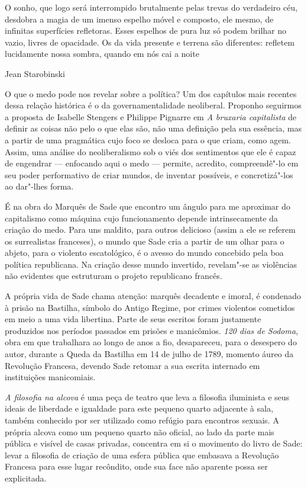 \epigraph{O sonho, que logo será interrompido brutalmente pelas trevas do
verdadeiro céu, desdobra a magia de um imenso espelho móvel e composto,
ele mesmo, de infinitas superfícies refletoras. Esses espelhos de pura
luz só podem brilhar no vazio, livres de opacidade. Os da vida presente
e terrena são diferentes: refletem lucidamente nossa sombra, quando em
nós cai a noite}{Jean Starobinski}

O que o medo pode nos revelar sobre a política? Um dos capítulos mais
recentes dessa relação histórica é o da governamentalidade neoliberal.
Proponho seguirmos a proposta de Isabelle Stengers e Philippe Pignarre em
\emph{A bruxaria capitalista} de definir as coisas não pelo o que elas
são, não uma definição pela sua essência, mas a partir de uma pragmática
cujo foco se desloca para o que criam, como agem. Assim, uma análise do
neoliberalismo sob o viés dos sentimentos que ele é capaz de engendrar ---
enfocando aqui o medo --- permite, acredito, compreendê"-lo em seu poder performativo de criar mundos, de inventar possíveis, e concretizá"-los ao dar"-lhes forma.

\asterisc

É na obra do Marquês de Sade que encontro um ângulo para me aproximar
do capitalismo como máquina cujo funcionamento depende intrinsecamente
da criação do medo. Para uns maldito, para outros delicioso (assim a ele
se referem os surrealistas franceses), o mundo que Sade cria a partir de
um olhar para o abjeto, para o violento escatológico, é o avesso do
mundo concebido pela boa política republicana. Na criação desse
mundo invertido, revelam"-se as violências não evidentes que estruturam o projeto
republicano francês.

A própria vida de Sade chama atenção: marquês decadente e imoral,
é condenado à prisão na Bastilha, símbolo do Antigo Regime, por crimes
violentos cometidos em meio a uma vida libertina. Parte de seus escritos
foram justamente produzidos nos períodos passados em prisões e
manicômios. \emph{120 dias de Sodoma}, obra em que trabalhara ao longo
de anos a fio, desapareceu, para o desespero do autor, durante a Queda
da Bastilha em 14 de julho de 1789, momento áureo da Revolução Francesa,
devendo Sade retomar a sua escrita internado em instituições
manicomiais.

\emph{A filosofia na alcova} é uma peça de teatro que leva a filosofia
iluminista e seus ideais de liberdade e igualdade para este
pequeno quarto adjacente à sala, também conhecido por ser utilizado como
refúgio para encontros sexuais. A própria alcova como um pequeno quarto
não oficial, ao lado da parte mais pública e visível de casas privadas,
concentra em si o movimento do livro de Sade: levar a filosofia de criação de
uma esfera pública que embasava a Revolução Francesa para esse lugar
recôndito, onde sua face não aparente possa ser explicitada.

